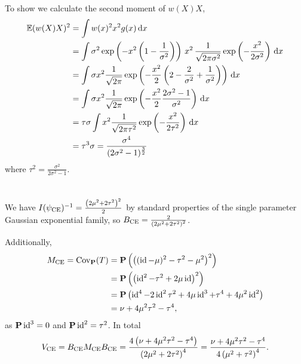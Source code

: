 \section*{}
To show  we calculate the second moment of $w(X)X$,
\begin{align*}
    \mathbb E (w(X)X)^{2} &= \int w(x)^{2} x^{2} g(x) \,\mathrm d x \\
    &= \int \sigma^{2} \exp \left( - x^{2} \left( 1 - \frac{1}{\sigma^{2}} \right)\right)\, x^{2}\, \frac{1}{\sqrt{2\pi\sigma^{2}}} \exp \left( -\frac{x^{2}}{2\sigma^{2}} \right)  \,\mathrm d x \\
    &= \int \sigma x^{2} \frac{1}{\sqrt{2\pi}}\exp \left( - \frac{x^{2}}{2} \left( 2 - \frac{2}{\sigma^{2}} + \frac{1}{\sigma^{2}} \right) \right)\,\mathrm d x \\
    &= \int \sigma x^{2} \frac{1}{\sqrt{2\pi}}\exp \left( - \frac{x^{2}}{2} \frac{2\sigma^{2} - 1}{\sigma^{2}} \right)\,\mathrm d x \\
    &= \tau \sigma \int x^{2} \frac{1}{\sqrt{2\pi\tau^{2}}} \exp \left( - \frac{x^{2}}{2\tau^{2}}\right)\,\mathrm d x \\
    &= \tau^{3} \sigma = \frac{\sigma^{4}}{(2\sigma^{2} - 1)^{\frac{3}{2}}}
\end{align*}
where $\tau^{2} = \frac{\sigma^{2}}{2\sigma^{2} - 1}$.

\section*{}
We have $I(\psi_{{\text{CE}}})^{-1} = \frac{ \left(2\mu^{2} + 2\tau^{2}\right)^{2}}{2} $ by standard properties of the single parameter Gaussian exponential family, so $B_{{\text{CE}}} = \frac{2}{\left(2\mu^{2} + 2\tau^{2}\right)^{2}}$. 

Additionally,
\begin{align*}
M_{{\text{CE}}} = \operatorname{Cov}_{\mathbf P} (T) & = \mathbf P \left( \left((\operatorname{id} - \mu)^{2} - \tau^{2} - \mu^{2} \right)^{2}\right)\\
    &= \mathbf P \left( \left( \operatorname{id}^{2} - \tau^{2} + 2\mu\operatorname{id} \right)^{2} \right) \\
    &= \mathbf P \left(\operatorname{id}^{4} - 2\operatorname{id}^{2}\tau^{2} + 4 \mu \operatorname{id}^{3} + \tau^{4} + 4\mu^{2}\operatorname{id}^{2}\right)\\
    &= \nu + 4 \mu^{2}\tau^{2} - \tau^{4},
\end{align*}
as $\mathbf P \operatorname{id}^{3} = 0$ and $\mathbf P \operatorname{id}^{2} = \tau^{2}$. In total 
$$
    V_{{\text{CE}}} = B_{{\text{CE}}} M_{{\text{CE}}} B_{{\text{CE}}} = \frac{4 \left(\nu + 4 \mu^{2}\tau^{2} - \tau^{4}\right)}{\left(2\mu^{2} + 2\tau^{2}\right)^{4}} = \frac{\nu + 4 \mu^{2}\tau^{2} - \tau^{4}}{4 \left( \mu^{2} + \tau^{2}\right)^{4}}.
$$

